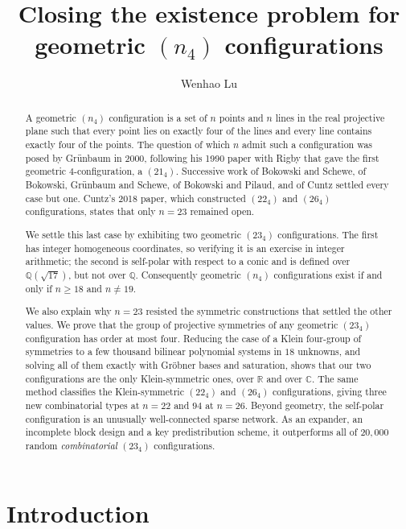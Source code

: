 \documentclass[11pt]{article}
\title{Closing the existence problem for geometric $(n_4)$ configurations}
\author{Wenhao Lu}
\date{}
\theoremstyle{plain}
\theoremstyle{definition}
\newcommand{\RR}{\mathbb{R}}
\newcommand{\CC}{\mathbb{C}}
\newcommand{\QQ}{\mathbb{Q}}
\begin{document}
\onehalfspacing



\maketitle
\thispagestyle{empty}
\newpage

\begin{abstract}
A geometric $(n_4)$ configuration is a set of $n$ points and $n$ lines in the real projective plane such that every point lies on exactly four of the lines and every line contains exactly four of the points.  The question of which $n$ admit such a configuration was posed by Gr\"unbaum in 2000, following his 1990 paper with Rigby that gave the first geometric $4$-configuration, a $(21_4)$.  Successive work of Bokowski and Schewe, of Bokowski, Gr\"unbaum and Schewe, of Bokowski and Pilaud, and of Cuntz settled every case but one.  Cuntz's 2018 paper, which constructed $(22_4)$ and $(26_4)$ configurations, states that only $n=23$ remained open.

We settle this last case by exhibiting two geometric $(23_4)$ configurations.  The first has integer homogeneous coordinates, so verifying it is an exercise in integer arithmetic; the second is self-polar with respect to a conic and is defined over $\QQ(\sqrt{17})$, but not over $\QQ$.  Consequently geometric $(n_4)$ configurations exist if and only if $n\ge18$ and $n\ne19$.

We also explain why $n=23$ resisted the symmetric constructions that settled the other values.  We prove that the group of projective symmetries of any geometric $(23_4)$ configuration has order at most four.  Reducing the case of a Klein four-group of symmetries to a few thousand bilinear polynomial systems in $18$ unknowns, and solving all of them exactly with Gr\"obner bases and saturation, shows that our two configurations are the only Klein-symmetric ones, over $\RR$ and over $\CC$.  The same method classifies the Klein-symmetric $(22_4)$ and $(26_4)$ configurations, giving three new combinatorial types at $n=22$ and $94$ at $n=26$.  Beyond geometry, the self-polar configuration is an unusually well-connected sparse network.  As an expander, an incomplete block design and a key predistribution scheme, it outperforms all of $20{,}000$ random \emph{combinatorial} $(23_4)$ configurations.
\end{abstract}
\thispagestyle{empty}
\newpage
\setcounter{page}{1}

\section{Introduction}\label{sec:intro}
\end{document}

